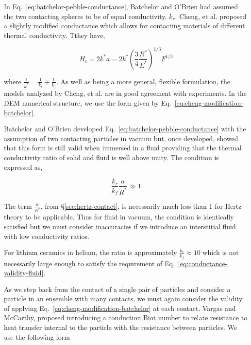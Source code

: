 In Eq.~\ref{eq:batchelor-pebble-conductance}, Batchelor and O'Brien had assumed the two contacting spheres to be of equal conductivity, $k_r$. Cheng, et al.\cite{Cheng19994199} proposed a slightly modified conductance which allows for contacting materials of different thermal conductivity. Tthey have,

\begin{equation}\label{eq:cheng-modification-batchelor}
	H_c = 2k^*a = 2k^* \left(\frac{3}{4}\frac{R^*}{E^*}\right)^{1/3}F^{1/3}
\end{equation}

where $\frac{1}{k^*} = \frac{1}{k_i} + \frac{1}{k_j}$. As well as being a more general, flexible formulation, the models analyzed by Cheng, et al.\cite{Cheng19994199} are in good agreement with experiments. In the DEM numerical structure, we use the form given by Eq.~\ref{eq:cheng-modification-batchelor}.

Batchelor and O'Brien developed Eq.~\ref{eq:batchelor-pebble-conductance} with the assumption of two contacting particles in vacuum but, once developed, showed\cite{Batchelor1977} that this form is still valid when immersed in a fluid providing that the thermal conductivity ratio of solid and fluid is well above unity. The condition is expressed as,

\begin{equation}\label{eq:conductance-validity-fluid}
	\frac{ k_r }{ k_f } \frac{a}{R^*} \gg 1
\end{equation}

The term $\frac{a}{R^*}$, from \S\ref{sec:hertz-contact}, is necessarily much less than 1 for Hertz theory to be applicable. Thus for fluid in vacuum, the condition is identically satisfied but we must consider inaccuracies if we introduce an interstitial fluid with low conductivity ratios. 

For lithium ceramics in helium, the ratio is approximately $\frac{k_r}{k_f} \approx 10$ which is not necessarily large enough to satisfy the requirement of Eq.~\ref{eq:conductance-validity-fluid}.

As we step back from the contact of a single pair of particles and consider a particle in an ensemble with many contacts, we must again consider the validity of applying Eq.~\ref{eq:cheng-modification-batchelor} at each contact. Vargas and McCarthy\cite{Vargas2002a}, proposed introducing a conduction Biot number to relate resistance to heat transfer internal to the particle with the resistance between particles. We use the following form

